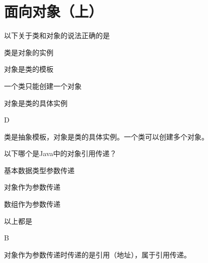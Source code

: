 \section{面向对象（上）}

\begin{question}
	以下关于类和对象的说法正确的是
	\begin{options}
		\item 类是对象的实例
		\item 对象是类的模板
		\item 一个类只能创建一个对象
		\item 对象是类的具体实例
	\end{options}
	\begin{answer}
		D
	\end{answer}
	\begin{explanation}
		类是抽象模板，对象是类的具体实例。一个类可以创建多个对象。
	\end{explanation}
\end{question}

\begin{question}
	以下哪个是Java中的对象引用传递？
	\begin{options}
		\item 基本数据类型参数传递
		\item 对象作为参数传递
		\item 数组作为参数传递
		\item 以上都是
	\end{options}
	\begin{answer}
		B
	\end{answer}
	\begin{explanation}
		对象作为参数传递时传递的是引用（地址），属于引用传递。
	\end{explanation}
\end{question}
